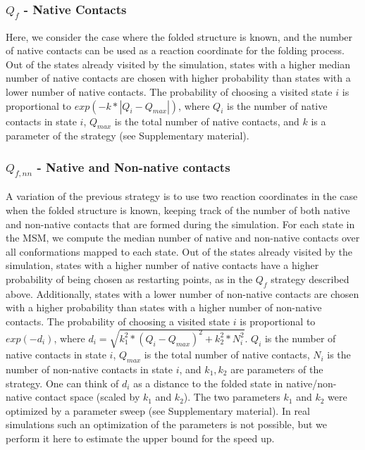 \subsubsection{$Q_{f}$ - Native Contacts}
 Here, we
consider the case where the folded structure is known, and the number of native
contacts can be used as a reaction coordinate for the folding
process. Out of the states already visited by the simulation, states with a
higher median number of native contacts are chosen with higher probability than
states with a lower number of native contacts. The probability of choosing a
visited state $i$ is proportional to $exp( - k * | Q_i - Q_{max} | )$, where
$Q_i$ is the number of native contacts in state $i$, $Q_{max}$ is the total number of
native contacts, and $k$ is a parameter of the strategy (see Supplementary material).


\subsubsection{$Q_{f,nn}$ - Native and Non-native contacts} 
A variation of the previous strategy is to use two reaction coordinates in the
case when the folded structure is known, keeping track of the number of both
native and non-native contacts that are formed during the simulation. For each
state in the MSM, we compute the median number
of native and non-native contacts over all conformations mapped to each state.
Out of the states already visited by the simulation, states with a higher
number of native contacts have a higher probability of being chosen as
restarting points, as in the $Q_{f}$ strategy described above. Additionally,
states with a lower number of non-native contacts are chosen with a higher
probability than states with a higher number of non-native contacts. The
probability of choosing a visited state $i$ is proportional to $exp(-d_i)$,
where $d_i = \sqrt{k_1^2 * (Q_i - Q_{max})^2  + k_2^2 * N_i^2}$. $Q_i$
is the number of native contacts in state $i$, $Q_{max}$ is the total number of
native contacts, $N_i$ is the number of
non-native contacts in state $i$, and $k_1, k_2$ are parameters of the
strategy. One can think of $d_i$ as a distance to the folded state in
native/non-native contact space (scaled by $k_1$ and $k_2$). The two parameters
$k_1$ and $k_2$ were optimized by a parameter sweep (see Supplementary material). 
In real simulations such an optimization of the parameters is not
possible, but we perform it here to estimate the upper bound for the speed up.


